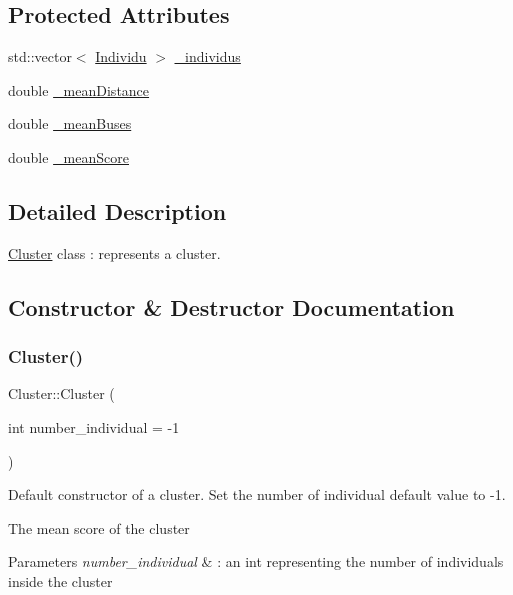 \subsection*{Protected Attributes}
\begin{DoxyCompactItemize}
\item 
std\+::vector$<$ \hyperlink{class_individu}{Individu} $>$ \hyperlink{class_cluster_ab5145f01fde3720b93e2a04d2717e9af}{\+\_\+individus}
\item 
double \hyperlink{class_cluster_a5f5ee52e489d25ca51debbb0c8f51a61}{\+\_\+mean\+Distance}
\item 
double \hyperlink{class_cluster_afbbaa003e21c0ddaea31bd1884d343b5}{\+\_\+mean\+Buses}
\item 
double \hyperlink{class_cluster_ad4ed0c777b3e31bcdfa670b9c6fe63d9}{\+\_\+mean\+Score}
\end{DoxyCompactItemize}


\subsection{Detailed Description}
\hyperlink{class_cluster}{Cluster} class \+: represents a cluster. 

\subsection{Constructor \& Destructor Documentation}
\mbox{\label{class_cluster_a6222a2684fffeb2ece34f556283e1299}} 
\subsubsection{\texorpdfstring{Cluster()}{Cluster()}\hspace{0.1cm}{\footnotesize\ttfamily [1/2]}}
{\footnotesize\ttfamily Cluster\+::\+Cluster (\begin{DoxyParamCaption}\item[{int}]{number\+\_\+individual = {\ttfamily -\/1} }\end{DoxyParamCaption})}



Default constructor of a cluster. Set the number of individual default value to -\/1. 

The mean score of the cluster


\begin{DoxyParams}{Parameters}
{\em number\+\_\+individual} & \+: an int representing the number of individuals inside the cluster \\
\hline
\end{DoxyParams}
\mbox{\label{class_cluster_a9f8b93e2cd87180f6518571c654a6a0a}} 
